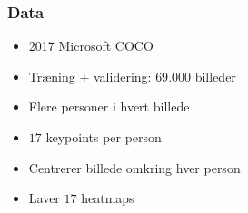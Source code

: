 \documentclass{beamer}
\begin{document}
\begin{frame}
    \frametitle{Data}
    \begin{minipage}{0.5\textwidth}
        \begin{itemize}
            \item 2017 Microsoft COCO
            \item Træning + validering: $69$.000 billeder
            \item Flere personer i hvert billede
            \item $17$ keypoints per person
            \item Centrerer billede omkring hver person
            \item Laver $17$ heatmaps
        \end{itemize}
    \end{minipage}
    \begin{minipage}{0.45\textwidth}
    \end{minipage}
\end{frame}
\end{document}
